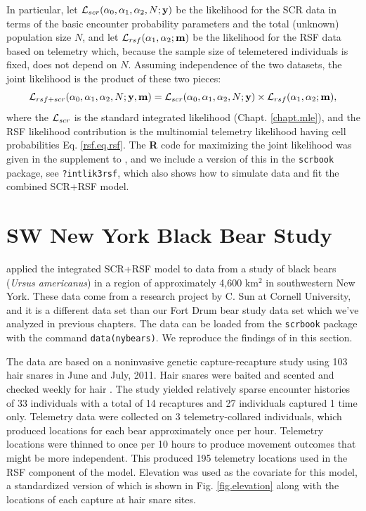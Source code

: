 In particular, let ${\cal L}_{scr}(\alpha_{0}, \alpha_{1}, \alpha_{2}, N;{\bf y})$
be the likelihood for the SCR data in terms of the basic encounter
probability parameters and the total (unknown) population size $N$,
and let ${\cal L}_{rsf}(\alpha_{1},\alpha_{2}; {\bf m})$ be the
likelihood for the RSF data based on telemetry which, because the
sample size of telemetered individuals is fixed, does not depend on $N$.
Assuming independence of the two datasets, the
joint likelihood is the product of these two pieces:
\[
{\cal L}_{rsf+scr}(\alpha_{0},\alpha_{1},\alpha_{2},N; {\bf y},{\bf
  m})  =
{\cal L}_{scr}(\alpha_{0}, \alpha_{1}, \alpha_{2}, N;{\bf y})
\times
{\cal L}_{rsf}(\alpha_{1},\alpha_{2}; {\bf m}),
\]
where the ${\cal L}_{scr}$ is the standard integrated likelihood
(Chapt. \ref{chapt.mle}), and the RSF likelihood contribution is the
multinomial telemetry likelihood having cell probabilities
Eq. \ref{rsf.eq.rsf}.  The {\bf R} code for maximizing the joint likelihood
was given in the
supplement to \citet{royle_etal:2012mee}, and we include a version of
this in the \mbox{\tt scrbook} package, see \mbox{\tt ?intlik3rsf},
which also shows how to simulate data and fit the combined SCR+RSF
model.


\section{SW  New York Black Bear Study}
\label{rsf.chapt.nybears}

\citet{royle_etal:2012mee} applied the integrated SCR+RSF model to
data from a study of black bears ({\it Ursus americanus})
in a region of approximately 4,600
km$^2$ in southwestern New York.  These data come from a research
project by C. Sun \citep{sun:2013} at Cornell University, and it is a
different data set than our Fort Drum bear study data set which we've analyzed
in previous chapters.  The data can be loaded from the \mbox{\tt scrbook}
package with the command \mbox{\tt data(nybears)}.
We reproduce the findings of \citet{royle_etal:2012mee} in this section.

The data are based on a noninvasive genetic capture-recapture study
using 103 hair snares in June and July, 2011.  Hair snares were baited
and scented and checked weekly for hair \citep{sun:2013}.  The study
yielded relatively sparse encounter histories
 of 33 individuals with a total of 14 recaptures and 27
individuals captured 1 time only.
Telemetry data were collected on 3 telemetry-collared individuals, which produced
locations for each bear approximately once per hour.  Telemetry
locations were
thinned to once per 10 hours to produce movement outcomes that might
be more independent. This produced 195 telemetry locations used in the
RSF component of the model.  Elevation was used as the covariate for this
model, a standardized version of which is shown in
Fig. \ref{fig.elevation} along with the locations of each
capture at hair snare sites.


